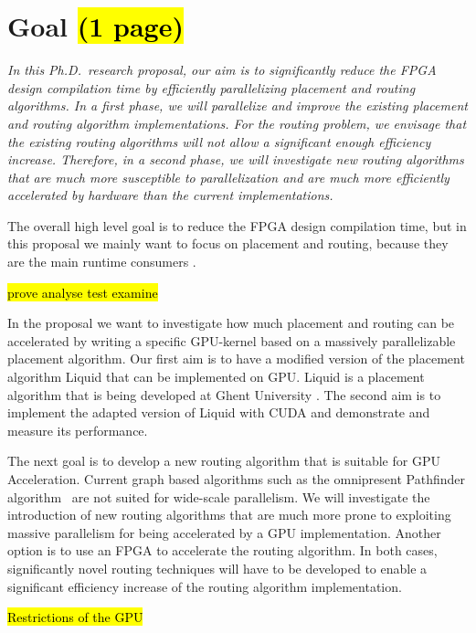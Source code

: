 \documentclass[a4paper,oneside,12pt]{article}
\begin{document}
\newpage

\section{Goal \hl{(1 page)}}

\emph{In this Ph.D.\ research proposal, our aim is to significantly reduce the FPGA design compilation time by efficiently parallelizing placement and routing algorithms. In a first phase, we will parallelize and improve the existing placement and routing algorithm implementations. For the routing problem, we envisage that the existing routing algorithms will not allow a significant enough efficiency increase. Therefore, in a second phase, we will investigate new routing algorithms that are much more susceptible to parallelization and are much more efficiently accelerated by hardware than the current implementations.}

The overall high level goal is to reduce the FPGA design compilation time, but in this proposal we mainly want to focus on placement and routing, because they are the main runtime consumers \cite{vansteenkiste2015analyzing}. 


\hl{
prove
analyse
test
examine
}

In the proposal we want to investigate how much placement and routing can be accelerated by writing a specific GPU-kernel based on a massively parallelizable placement algorithm.
Our first aim is to have a modified version of the placement algorithm {\sc Liquid} that can be implemented on GPU. {\sc Liquid} is a placement algorithm that is being developed at Ghent University \cite{liquid}.  The second aim is to implement the adapted version of {\sc Liquid} with CUDA \cite{nickolls2008scalable} and demonstrate and measure its performance.

The next goal is to develop a new routing algorithm that is suitable for GPU Acceleration. Current graph based algorithms such as the omnipresent Pathfinder algorithm~\cite{} are not suited for wide-scale parallelism. We will investigate the introduction of new routing algorithms that are much more prone to exploiting massive parallelism for being accelerated by a GPU
implementation. Another option is to use an FPGA to accelerate the routing algorithm. In both cases, significantly novel routing techniques will have to be developed to enable a significant efficiency increase of the routing algorithm implementation.


\hl{Restrictions of the GPU}
\end{document}
